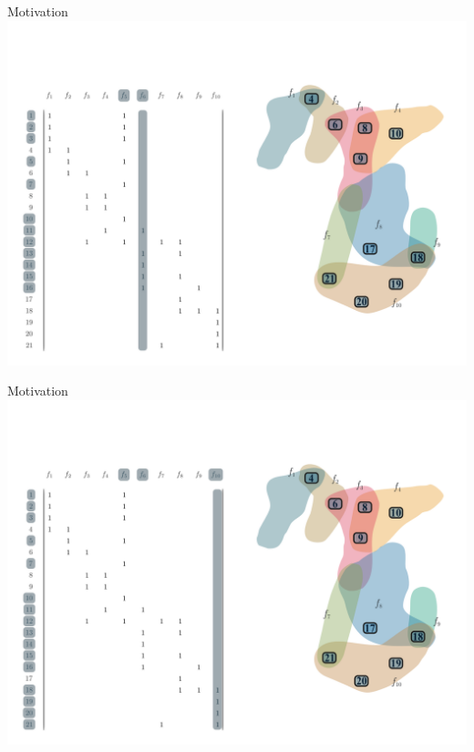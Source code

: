 \documentclass[10pt]{beamer}
\begin{document}
\begin{frame}[fragile]{Motivation}
    \vspace*{-3em}\hspace*{-2em}\includegraphics[width=1.15\textwidth]{Images/LSAExample/06}
\end{frame}

\begin{frame}[fragile]{Motivation}
    \vspace*{-3em}\hspace*{-2em}\includegraphics[width=1.15\textwidth]{Images/LSAExample/07}
\end{frame}
\end{document}
